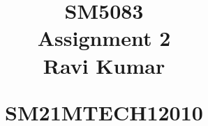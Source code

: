 \documentclass[journal,12pt,twocolumn]{IEEEtran}
\begin{document}
%


\newtheorem{theorem}{Theorem}[section]
\newtheorem{problem}{Problem}
\newtheorem{proposition}{Proposition}[section]
\newtheorem{lemma}{Lemma}[section]
\newtheorem{corollary}[theorem]{Corollary}
\newtheorem{example}{Example}[section]
\newtheorem{definition}[problem]{Definition}
\newcommand{\BEQA}{\begin{eqnarray}}
\newcommand{\EEQA}{\end{eqnarray}}
\newcommand{\define}{\stackrel{\triangle}{=}}

\providecommand{\mbf}{\mathbf}
\providecommand{\pr}[1]{\ensuremath{\Pr\left(#1\right)}}
\providecommand{\qfunc}[1]{\ensuremath{Q\left(#1\right)}}
\providecommand{\sbrak}[1]{\ensuremath{{}\left[#1\right]}}
\providecommand{\lsbrak}[1]{\ensuremath{{}\left[#1\right.}}
\providecommand{\rsbrak}[1]{\ensuremath{{}\left.#1\right]}}
\providecommand{\brak}[1]{\ensuremath{\left(#1\right)}}
\providecommand{\lbrak}[1]{\ensuremath{\left(#1\right.}}
\providecommand{\rbrak}[1]{\ensuremath{\left.#1\right)}}
\providecommand{\cbrak}[1]{\ensuremath{\left\{#1\right\}}}
\providecommand{\lcbrak}[1]{\ensuremath{\left\{#1\right.}}
\providecommand{\rcbrak}[1]{\ensuremath{\left.#1\right\}}}
\theoremstyle{remark}
\newtheorem{rem}{Remark}
\newcommand{\sgn}{\mathop{\mathrm{sgn}}}
\providecommand{\abs}[1]{\lvert#1\rvert}
\providecommand{\res}[1]{\Res\displaylimits_{#1}} 
\providecommand{\norm}[1]{\lVert#1\rVert}
\providecommand{\mtx}[1]{\mathbf{#1}}
\providecommand{\fourier}{\overset{\mathcal{F}}{ \rightleftharpoons}}
\providecommand{\system}{\overset{\mathcal{H}}{ \longleftrightarrow}}
\newcommand{\solution}{\noindent \textbf{Solution: }}
\newcommand{\cosec}{\,\text{cosec}\,}
\providecommand{\dec}[2]{\ensuremath{\overset{#1}{\underset{#2}{\gtrless}}}}
\newcommand{\myvec}[1]{\ensuremath{\begin{pmatrix}#1\end{pmatrix}}}
\newcommand{\cmyvec}[1]{\ensuremath{\begin{pmatrix*}[c]#1\end{pmatrix*}}}
\newcommand{\mydet}[1]{\ensuremath{\begin{vmatrix}#1\end{vmatrix}}}
\newcommand{\proj}[2]{\textbf{proj}_{\vec{#1}}\vec{#2}}
\newcommand{\RNum}[1]{\uppercase\expandafter{\romannumeral #1\relax}}
\let\StandardTheFigure\thefigure
\let\vec\mathbf
\title{
\LARGE SM5083\\
    \LARGE Assignment 2 \\[0.5em]
    
    \large Ravi Kumar\par
    \large   SM21MTECH12010  \par
}
\maketitle
\renewcommand{\thefigure}{\theenumi}
\renewcommand{\thetable}{\theenumi}
\end{document}
